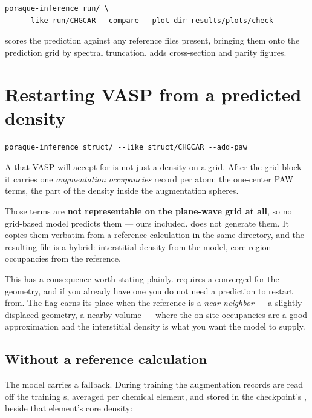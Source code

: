 \begin{lstlisting}
poraque-inference run/ \
    --like run/CHGCAR --compare --plot-dir results/plots/check
\end{lstlisting}

 scores the prediction against any reference files present,
bringing them onto the prediction grid by spectral truncation. 
adds cross-section and parity figures.

\section{Restarting VASP from a predicted density}
\label{sec:add-paw}

\begin{lstlisting}
poraque-inference struct/ --like struct/CHGCAR --add-paw
\end{lstlisting}

A  that VASP will accept for  is not just a density
on a grid. After the grid block it carries one \emph{augmentation occupancies}
record per atom: the one-center PAW terms, the part of the density inside the
augmentation spheres.

\begin{pwarn}
Those terms are \textbf{not representable on the plane-wave grid at all}, so no
grid-based model predicts them --- ours included. \opt{--add-paw} does not
generate them. It copies them verbatim from a reference calculation in the same
directory, and the resulting file is a hybrid: interstitial density from the
model, core-region occupancies from the reference.
\end{pwarn}

This has a consequence worth stating plainly.  requires a
converged \file{CHGCAR} for the geometry, and if you already have one you do
not need a prediction to restart from. The flag earns its place when the
reference is a \emph{near-neighbor} --- a slightly displaced geometry, a
nearby volume --- where the on-site occupancies are a good approximation and
the interstitial density is what you want the model to supply.

\subsection{Without a reference calculation}

The model carries a fallback. During training the augmentation records are read
off the training \file{CHGCAR}s, averaged per chemical element, and stored in
the checkpoint's \opt{paw\_profiles}, beside that element's core density:

